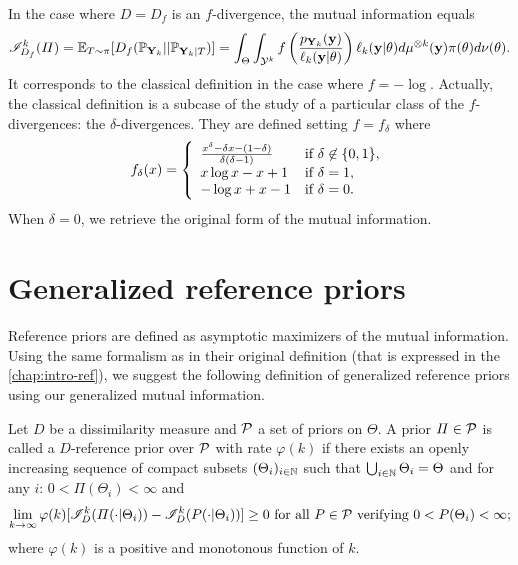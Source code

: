 In the case where $D=D_f$ is an $f$-divergence, the mutual information equals
    \begin{equation}
        \mathscr{I}_{D_f}^k(\varPi) =\mathbb{E}_{T\sim\pi}[D_f(\mathbb{P}_{\mathbf{Y}_k}||\mathbb{P}_{\mathbf{Y}_k|T})] = \int_\Theta\int_{\mathcal{Y}^k}f\left( \frac{p_{\mathbf{Y}_k}(\mathbf{y})}{\ell_k(\mathbf{y}|\theta)} \right) \ell_k(\mathbf{y}|\theta)d\mu^{\otimes k}(\mathbf{y}) \pi(\theta)d\nu(\theta).
    \end{equation}
It corresponds to  the classical definition in the case where $f=-\log$. Actually, the classical definition is a subcase of the study of a particular class of the $f$-divergences:  the $\delta$-divergences. They are defined setting $f=f_\delta$ where 
\begin{equation}
    f_\delta(x) = \left\lbrace\begin{array}{l l} \frac{x^\delta-\delta x-(1-\delta)}{\delta(\delta-1)} & \text{if\ }\delta\not\in\{0,1\},\\ 
        x\log x-x+1  & \text{if\ }\delta=1, \\
        -\log x +x -1 & \text{if\ }\delta=0.
    \end{array}\right. 
\end{equation}    
When $\delta=0$, we retrieve the original form of the mutual information.


\section{Generalized reference priors}


Reference priors are defined as asymptotic maximizers of the mutual information. Using the same formalism as in their original definition (that is expressed in the \cref{chap:intro-ref}), we suggest the following definition of generalized reference priors using our generalized mutual information.

\begin{defi}\label{def:genref}
    Let $D$ be a dissimilarity measure and $\mathcal{P}$ a set of priors on $\Theta$. A prior $\varPi\in\mathcal{P}$ is called a $D$-reference prior over $\mathcal{P}$ with rate $\varphi(k)$ if there exists an openly increasing  sequence of compact subsets $(\Theta_i)_{i\in\mathbb{N}}$
    such that $\bigcup_{i\in\mathbb{N}}\Theta_i=\Theta$ and for any $i$: $0<\varPi(\Theta_i)<\infty $ and
        \begin{equation}\label{eq:defrefpriorsi}
            \lim_{k\rightarrow\infty}\varphi(k)[\sI^k_D(\varPi(\cdot|\Theta_i))-\sI^k_D(P(\cdot|\Theta_i))] \geq0 \text{\ for all\ } P\in\cP\text{\ verifying\ }0<P(\Theta_i)<\infty;
        \end{equation}
    where  $\varphi(k)$ is a {positive and}  monotonous function of $k$.
\end{defi}


